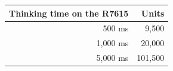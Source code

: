 \begin{tabular}{rr}
\toprule
Thinking time on the R7615 & Units \\
\midrule
500 ms & 9,500 \\
1,000 ms & 20,000 \\
5,000 ms & 101,500 \\
\bottomrule
\end{tabular}
